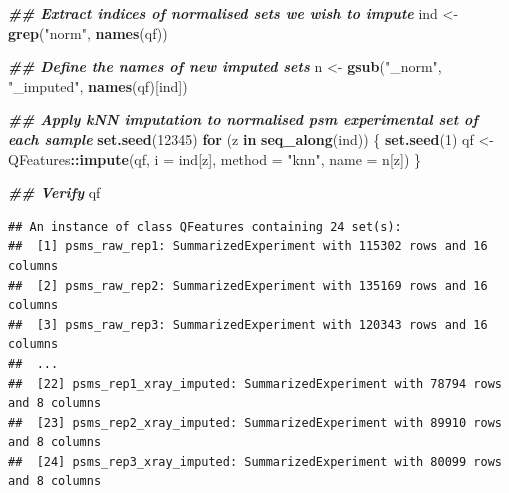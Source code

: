 \documentclass[9pt,a4paper,]{extarticle}
\newenvironment{Shaded}{\begin{snugshade}}{\end{snugshade}}
\newcommand{\AttributeTok}[1]{\textcolor[rgb]{0.13,0.29,0.53}{#1}}
\newcommand{\ControlFlowTok}[1]{\textcolor[rgb]{0.13,0.29,0.53}{\textbf{#1}}}
\newcommand{\DecValTok}[1]{\textcolor[rgb]{0.00,0.00,0.81}{#1}}
\newcommand{\DocumentationTok}[1]{\textcolor[rgb]{0.56,0.35,0.01}{\textbf{\textit{#1}}}}
\newcommand{\FunctionTok}[1]{\textcolor[rgb]{0.13,0.29,0.53}{\textbf{#1}}}
\newcommand{\NormalTok}[1]{#1}
\newcommand{\OtherTok}[1]{\textcolor[rgb]{0.56,0.35,0.01}{#1}}
\newcommand{\SpecialCharTok}[1]{\textcolor[rgb]{0.81,0.36,0.00}{\textbf{#1}}}
\newcommand{\StringTok}[1]{\textcolor[rgb]{0.31,0.60,0.02}{#1}}
\begin{document}
\begin{Shaded}
\begin{Highlighting}[]
\DocumentationTok{\#\# Extract indices of normalised sets we wish to impute}
\NormalTok{ind }\OtherTok{\textless{}{-}} \FunctionTok{grep}\NormalTok{(}\StringTok{"norm"}\NormalTok{, }\FunctionTok{names}\NormalTok{(qf))}

\DocumentationTok{\#\# Define the names of new imputed sets}
\NormalTok{n }\OtherTok{\textless{}{-}} \FunctionTok{gsub}\NormalTok{(}\StringTok{"\_norm"}\NormalTok{, }\StringTok{"\_imputed"}\NormalTok{, }\FunctionTok{names}\NormalTok{(qf)[ind])}

\DocumentationTok{\#\# Apply kNN imputation to normalised psm experimental set of each sample}
\FunctionTok{set.seed}\NormalTok{(}\DecValTok{12345}\NormalTok{)}
\ControlFlowTok{for}\NormalTok{ (z }\ControlFlowTok{in} \FunctionTok{seq\_along}\NormalTok{(ind)) \{}
  \FunctionTok{set.seed}\NormalTok{(}\DecValTok{1}\NormalTok{)}
\NormalTok{  qf }\OtherTok{\textless{}{-}}\NormalTok{ QFeatures}\SpecialCharTok{::}\FunctionTok{impute}\NormalTok{(qf, }
                          \AttributeTok{i =}\NormalTok{ ind[z], }
                          \AttributeTok{method =} \StringTok{"knn"}\NormalTok{,}
                          \AttributeTok{name =}\NormalTok{ n[z])}
\NormalTok{\}}
\end{Highlighting}
\end{Shaded}

\begin{Shaded}
\begin{Highlighting}[]
\DocumentationTok{\#\# Verify}
\NormalTok{qf}
\end{Highlighting}
\end{Shaded}

\begin{verbatim}
## An instance of class QFeatures containing 24 set(s):
##  [1] psms_raw_rep1: SummarizedExperiment with 115302 rows and 16 columns 
##  [2] psms_raw_rep2: SummarizedExperiment with 135169 rows and 16 columns 
##  [3] psms_raw_rep3: SummarizedExperiment with 120343 rows and 16 columns 
##  ...
##  [22] psms_rep1_xray_imputed: SummarizedExperiment with 78794 rows and 8 columns 
##  [23] psms_rep2_xray_imputed: SummarizedExperiment with 89910 rows and 8 columns 
##  [24] psms_rep3_xray_imputed: SummarizedExperiment with 80099 rows and 8 columns
\end{verbatim}
\end{document}

